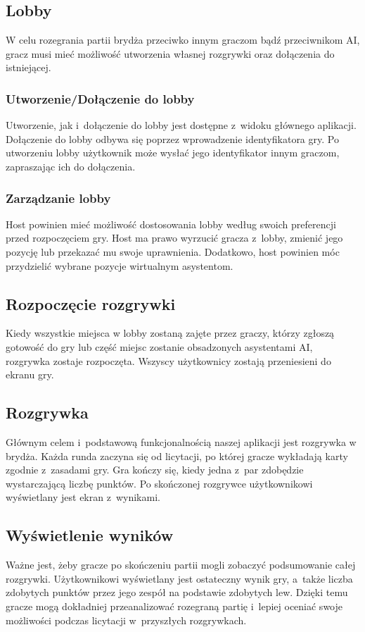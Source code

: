\subsection{Lobby}
W celu rozegrania partii brydża przeciwko innym graczom bądź
przeciwnikom AI, gracz musi mieć możliwość utworzenia własnej
rozgrywki oraz dołączenia do istniejącej.
\subsubsection{Utworzenie/Dołączenie do lobby} 
Utworzenie, jak i~dołączenie do lobby jest dostępne z~widoku głównego aplikacji. Dołączenie do lobby
odbywa się poprzez wprowadzenie identyfikatora gry. Po utworzeniu lobby użytkownik może
wysłać jego identyfikator innym graczom, zapraszając ich do dołączenia.
\subsubsection{Zarządzanie lobby}
Host powinien mieć możliwość dostosowania lobby według swoich preferencji przed 
rozpoczęciem gry. Host ma prawo wyrzucić gracza z~lobby, zmienić jego pozycję lub przekazać 
mu swoje uprawnienia. Dodatkowo, host powinien móc przydzielić wybrane pozycje 
wirtualnym asystentom.

\subsection{Rozpoczęcie rozgrywki}
Kiedy wszystkie miejsca w lobby zostaną zajęte przez graczy, którzy zgłoszą gotowość do gry 
lub część miejsc zostanie obsadzonych asystentami AI, rozgrywka zostaje rozpoczęta. 
Wszyscy użytkownicy zostają przeniesieni do ekranu gry.
\subsection{Rozgrywka}
Głównym celem i~podstawową funkcjonalnością naszej aplikacji jest
rozgrywka w brydża. Każda runda zaczyna się od licytacji, po której
gracze wykładają karty zgodnie z~zasadami gry. Gra kończy się, kiedy
jedna z~par zdobędzie wystarczającą liczbę punktów. Po skończonej
rozgrywce użytkownikowi wyświetlany jest ekran z~wynikami.
\subsection{Wyświetlenie wyników}
Ważne jest, żeby gracze po skończeniu partii mogli zobaczyć
podsumowanie całej rozgrywki. Użytkownikowi wyświetlany jest ostateczny
wynik gry, a~także liczba zdobytych punktów przez jego zespół na
podstawie zdobytych lew. Dzięki temu gracze mogą dokładniej
przeanalizować rozegraną partię i~lepiej oceniać swoje możliwości
podczas licytacji w~przyszłych rozgrywkach.
